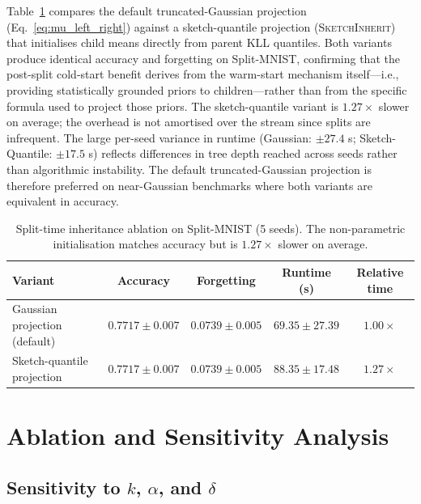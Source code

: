 \documentclass{article}
\begin{document}
Table~\ref{tab:inheritance-ablation} compares the default truncated-Gaussian
projection (Eq.~\eqref{eq:mu_left_right}) against a
sketch-quantile projection (\textsc{SketchInherit}) that initialises child
means directly from parent KLL quantiles. Both variants produce identical
accuracy and forgetting on Split-MNIST,
confirming that the post-split cold-start benefit derives from the warm-start
mechanism itself---i.e., providing statistically grounded priors to
children---rather than from the specific formula used to project those priors.
The sketch-quantile variant is $1.27\times$ slower on average; the overhead
is not amortised over the stream since splits are infrequent. The large
per-seed variance in runtime (Gaussian: ${\pm}27.4$ s; Sketch-Quantile:
${\pm}17.5$ s) reflects differences in tree depth reached across seeds rather
than algorithmic instability. The default truncated-Gaussian projection is
therefore preferred on near-Gaussian benchmarks where both variants are
equivalent in accuracy.
\begin{table}[h]
\caption{Split-time inheritance ablation on Split-MNIST (5 seeds). The non-parametric initialisation matches
accuracy but is $1.27\times$ slower on average.}
\label{tab:inheritance-ablation}
\centering
\small
\begin{tabular}{lcccc}
\toprule
Variant & Accuracy & Forgetting & Runtime (s) & Relative time \\
\midrule
Gaussian projection (default) & $0.7717\pm0.007$ & $0.0739\pm0.005$ & $69.35\pm27.39$ & $1.00\times$ \\
Sketch-quantile projection    & $0.7717\pm0.007$ & $0.0739\pm0.005$ & $88.35\pm17.48$ & $1.27\times$ \\
\bottomrule
\end{tabular}
\end{table}

\section{Ablation and Sensitivity Analysis}
\label{app:ablation}

\subsection{Sensitivity to $k$, $\alpha$, and $\delta$}
\label{app:sensitivity}
\end{document}
